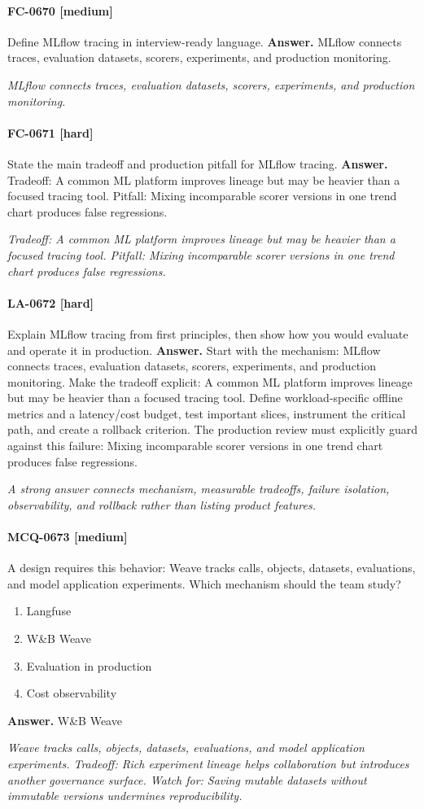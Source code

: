 \paragraph{FC-0670 [medium]} Define MLflow tracing in interview-ready language.
\noindent\textbf{Answer.} MLflow connects traces, evaluation datasets, scorers, experiments, and production monitoring.
\par\textit{MLflow connects traces, evaluation datasets, scorers, experiments, and production monitoring.}
\paragraph{FC-0671 [hard]} State the main tradeoff and production pitfall for MLflow tracing.
\noindent\textbf{Answer.} Tradeoff: A common ML platform improves lineage but may be heavier than a focused tracing tool. Pitfall: Mixing incomparable scorer versions in one trend chart produces false regressions.
\par\textit{Tradeoff: A common ML platform improves lineage but may be heavier than a focused tracing tool. Pitfall: Mixing incomparable scorer versions in one trend chart produces false regressions.}
\paragraph{LA-0672 [hard]} Explain MLflow tracing from first principles, then show how you would evaluate and operate it in production.
\noindent\textbf{Answer.} Start with the mechanism: MLflow connects traces, evaluation datasets, scorers, experiments, and production monitoring. Make the tradeoff explicit: A common ML platform improves lineage but may be heavier than a focused tracing tool. Define workload-specific offline metrics and a latency/cost budget, test important slices, instrument the critical path, and create a rollback criterion. The production review must explicitly guard against this failure: Mixing incomparable scorer versions in one trend chart produces false regressions.
\par\textit{A strong answer connects mechanism, measurable tradeoffs, failure isolation, observability, and rollback rather than listing product features.}
\paragraph{MCQ-0673 [medium]} A design requires this behavior: Weave tracks calls, objects, datasets, evaluations, and model application experiments. Which mechanism should the team study?
\begin{enumerate}[label=\Alph*.]
\item Langfuse
\item W\&B Weave
\item Evaluation in production
\item Cost observability
\end{enumerate}
\noindent\textbf{Answer.} W\&B Weave
\par\textit{Weave tracks calls, objects, datasets, evaluations, and model application experiments. Tradeoff: Rich experiment lineage helps collaboration but introduces another governance surface. Watch for: Saving mutable datasets without immutable versions undermines reproducibility.}
